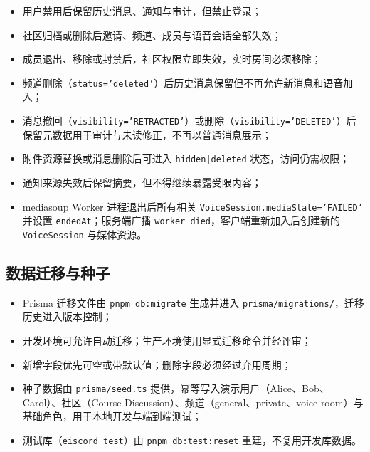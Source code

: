 \begin{itemize}
  \item 用户禁用后保留历史消息、通知与审计，但禁止登录；
  \item 社区归档或删除后邀请、频道、成员与语音会话全部失效；
  \item 成员退出、移除或封禁后，社区权限立即失效，实时房间必须移除；
  \item 频道删除（\texttt{status='deleted'}）后历史消息保留但不再允许新消息和语音加入；
  \item 消息撤回（\texttt{visibility='RETRACTED'}）或删除（\texttt{visibility='DELETED'}）后保留元数据用于审计与未读修正，不再以普通消息展示；
  \item 附件资源替换或消息删除后可进入 \texttt{hidden|deleted} 状态，访问仍需权限；
  \item 通知来源失效后保留摘要，但不得继续暴露受限内容；
  \item mediasoup Worker 进程退出后所有相关 \texttt{VoiceSession.mediaState='FAILED'} 并设置 \texttt{endedAt}；服务端广播 \texttt{worker\_died}，客户端重新加入后创建新的 \texttt{VoiceSession} 与媒体资源。
\end{itemize}

\subsection{数据迁移与种子}

\begin{itemize}
  \item Prisma 迁移文件由 \texttt{pnpm db:migrate} 生成并进入 \texttt{prisma/migrations/}，迁移历史进入版本控制；
  \item 开发环境可允许自动迁移；生产环境使用显式迁移命令并经评审；
  \item 新增字段优先可空或带默认值；删除字段必须经过弃用周期；
  \item 种子数据由 \texttt{prisma/seed.ts} 提供，幂等写入演示用户（Alice、Bob、Carol）、社区（Course Discussion）、频道（general、private、voice-room）与基础角色，用于本地开发与端到端测试；
  \item 测试库（\texttt{eiscord\_test}）由 \texttt{pnpm db:test:reset} 重建，不复用开发库数据。
\end{itemize}

